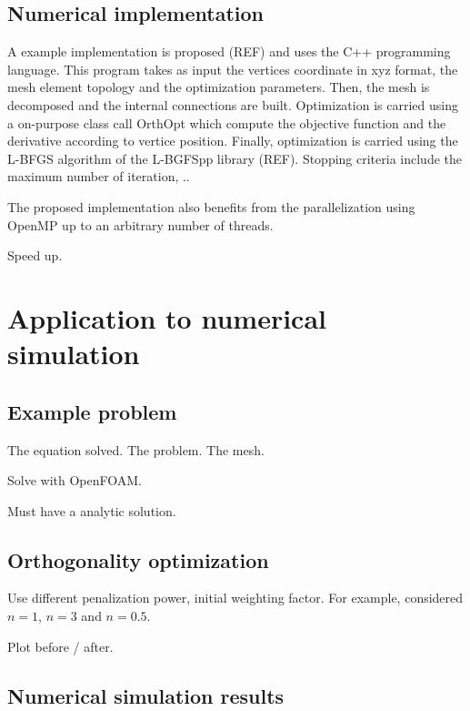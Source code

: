 \documentclass[11pt]{article}
\begin{document}
\subsection{Numerical implementation}

A example implementation is proposed (REF) and uses the C++ programming language. 
This program takes as input the vertices coordinate in xyz format, the mesh element topology and the optimization parameters. 
Then, the mesh is decomposed and the internal connections are built. Optimization is carried using a on-purpose class call OrthOpt which compute the objective function and the derivative according to vertice position. 
Finally, optimization is carried using the L-BFGS algorithm of the L-BGFSpp library (REF). Stopping criteria include the maximum number of iteration, ..

The proposed implementation also benefits from the parallelization using OpenMP up to an arbitrary number of threads. 

Speed up.



\section{Application to numerical simulation}

\subsection{Example problem}

The equation solved. The problem. The mesh.

Solve with OpenFOAM.

Must have a analytic solution. 

\subsection{Orthogonality optimization}

Use different penalization power, initial weighting factor. 
For example, considered $n=1$, $n=3$ and $n=0.5$.

Plot before / after.

\subsection{Numerical simulation results}
\end{document}

